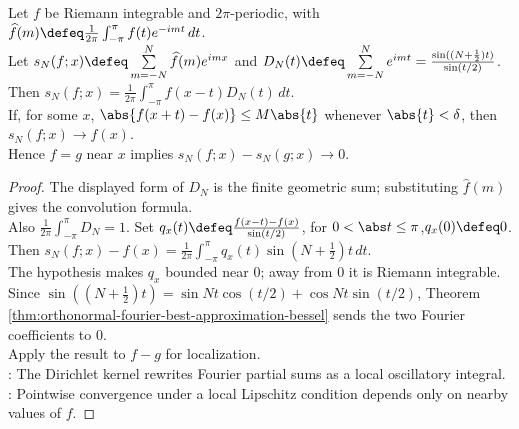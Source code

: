 \begin{theorem} \label{thm:trigonometric-fourier-dirichlet-localization} \\
Let $f$ be Riemann integrable and $2\pi$-periodic, with $\widehat{f}(m)\defeq\frac{1}{2\pi}\int_{-\pi}^{\pi}f(t)e^{-imt}\,dt$.\\
Let $s_N(f;x)\defeq\sum\limits_{m=-N}^{N}\widehat{f}(m)e^{imx}$ and $D_N(t)\defeq\sum\limits_{m=-N}^{N}e^{imt}=\frac{\sin((N+\frac12)t)}{\sin(t/2)}$.\\
Then $s_N(f;x)=\frac{1}{2\pi}\int_{-\pi}^{\pi}f(x-t)D_N(t)\,dt$.\\
If, for some $x$, $\abs{f(x+t)-f(x)}\leq M\abs{t}$ whenever $\abs{t}<\delta$, then $s_N(f;x)\to f(x)$.\\
Hence $f=g$ near $x$ implies $s_N(f;x)-s_N(g;x)\to0$.
\begin{proof}
The displayed form of $D_N$ is the finite geometric sum; substituting $\widehat f(m)$ gives the convolution formula.\\
Also $\frac1{2\pi}\int_{-\pi}^{\pi}D_N=1$. Set $q_x(t)\defeq \frac{f(x-t)-f(x)}{\sin(t/2)}$, for $0<\abs t\leq\pi$,$q_x(0)\defeq0$.\\
Then $s_N(f;x)-f(x)=\frac{1}{2\pi}\int_{-\pi}^{\pi} q_x(t)\sin\!\left(N+\frac12\right)t\,dt$.\\
The hypothesis makes $q_x$ bounded near $0$; away from $0$ it is Riemann integrable.\\
Since $\sin((N+\frac12)t)=\sin Nt\cos(t/2)+\cos Nt\sin(t/2)$, Theorem \ref{thm:orthonormal-fourier-best-approximation-bessel} sends the two Fourier coefficients to $0$.\\
Apply the result to $f-g$ for localization.\\
: The Dirichlet kernel rewrites Fourier partial sums as a local oscillatory integral.\\
: Pointwise convergence under a local Lipschitz condition depends only on nearby values of $f$.
\end{proof}
\end{theorem}

